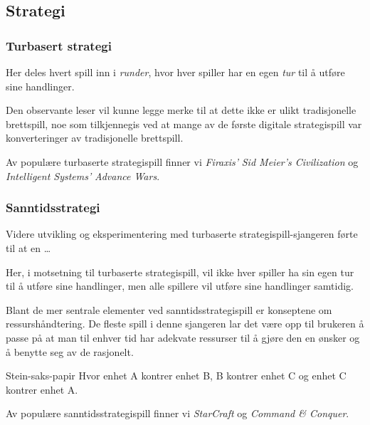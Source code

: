 \subsection{Strategi}\label{sec:strategispill}

	\subsubsection{Turbasert strategi}

	Her deles hvert spill inn i \emph{runder}, hvor hver spiller har en egen \emph{tur} til å utføre sine handlinger.


	Den observante leser vil kunne legge merke til at dette ikke er ulikt tradisjonelle brettspill, noe som tilkjennegis ved at mange av de første digitale strategispill var konverteringer av tradisjonelle brettspill.

	Av populære turbaserte strategispill finner vi \emph{Firaxis'} \emph{Sid Meier's Civilization} og \emph{Intelligent Systems'} \emph{Advance Wars}. %



	\subsubsection{Sanntidsstrategi}

	Videre utvikling og eksperimentering med turbaserte strategispill-sjangeren førte til at en …

	Her, i motsetning til turbaserte strategispill, vil ikke hver spiller ha sin egen tur til å utføre sine handlinger, men alle spillere vil utføre sine handlinger samtidig.

	Blant de mer sentrale elementer ved sanntidsstrategispill er konseptene om ressurshåndtering. De fleste spill i denne sjangeren lar det være opp til brukeren å passe på at man til enhver tid har adekvate ressurser til å gjøre den en ønsker og å benytte seg av de rasjonelt.

	Stein-saks-papir
	Hvor enhet A kontrer enhet B, B kontrer enhet C og enhet C kontrer enhet A.


	Av populære sanntidsstrategispill finner vi \emph{StarCraft} og \emph{Command \& Conquer}.

